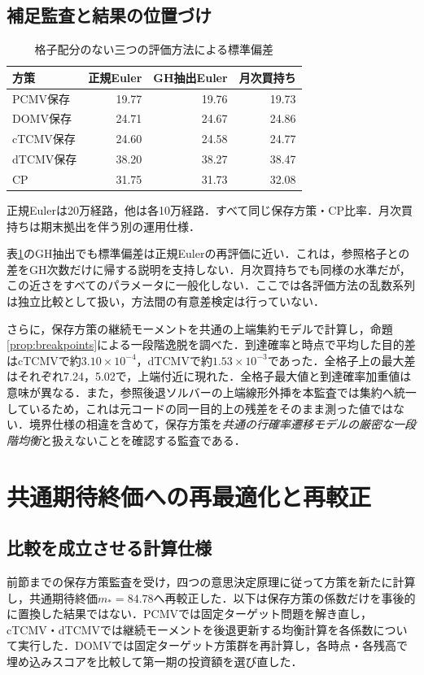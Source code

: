 \documentclass[10pt,a4paper]{article}
\numberwithin{equation}{section}
\numberwithin{table}{section}
\numberwithin{figure}{section}
\theoremstyle{plain}
\theoremstyle{definition}
\begin{document}
\subsection{補足監査と結果の位置づけ}
\begin{table}[htbp]\centering\small
\caption{格子配分のない三つの評価方法による標準偏差}\label{tab:robust}
\begin{tabular}{lrrr}
\toprule
方策 & 正規Euler & GH抽出Euler & 月次買持ち \\ \midrule
PCMV保存 & 19.77 & 19.76 & 19.73 \\
DOMV保存 & 24.71 & 24.67 & 24.86 \\
cTCMV保存 & 24.60 & 24.58 & 24.77 \\
dTCMV保存 & 38.20 & 38.27 & 38.47 \\
CP & 31.75 & 31.73 & 32.08 \\
\bottomrule\end{tabular}
\par\vspace{3pt}\begin{minipage}{0.97\textwidth}\footnotesize 正規Eulerは20万経路，他は各10万経路．すべて同じ保存方策・CP比率．月次買持ちは期末拠出を伴う別の運用仕様．\end{minipage}
\end{table}
表\ref{tab:robust}のGH抽出でも標準偏差は正規Eulerの再評価に近い．これは，参照格子との差をGH次数だけに帰する説明を支持しない．月次買持ちでも同様の水準だが，この近さをすべてのパラメータに一般化しない．ここでは各評価方法の乱数系列は独立比較として扱い，方法間の有意差検定は行っていない．

さらに，保存方策の継続モーメントを共通の上端集約モデルで計算し，命題\ref{prop:breakpoints}による一段階逸脱を調べた．到達確率と時点で平均した目的差はcTCMVで約$3.10\times10^{-4}$，dTCMVで約$1.53\times10^{-3}$であった．全格子上の最大差はそれぞれ7.24，5.02で，上端付近に現れた．全格子最大値と到達確率加重値は意味が異なる．また，参照後退ソルバーの上端線形外挿を本監査では集約へ統一しているため，これは元コードの同一目的上の残差をそのまま測った値ではない．境界仕様の相違を含めて，保存方策を\emph{共通の行確率遷移モデルの厳密な一段階均衡}と扱えないことを確認する監査である．

\section{共通期待終価への再最適化と再較正}
\label{sec:equalmean}
\subsection{比較を成立させる計算仕様}
前節までの保存方策監査を受け，四つの意思決定原理に従って方策を新たに計算し，共通期待終価$m_*=84.78$へ再較正した．以下は保存方策の係数だけを事後的に置換した結果ではない．PCMVでは固定ターゲット問題を解き直し，cTCMV・dTCMVでは継続モーメントを後退更新する均衡計算を各係数について実行した．DOMVでは固定ターゲット方策群を再計算し，各時点・各残高で埋め込みスコアを比較して第一期の投資額を選び直した．
\end{document}
